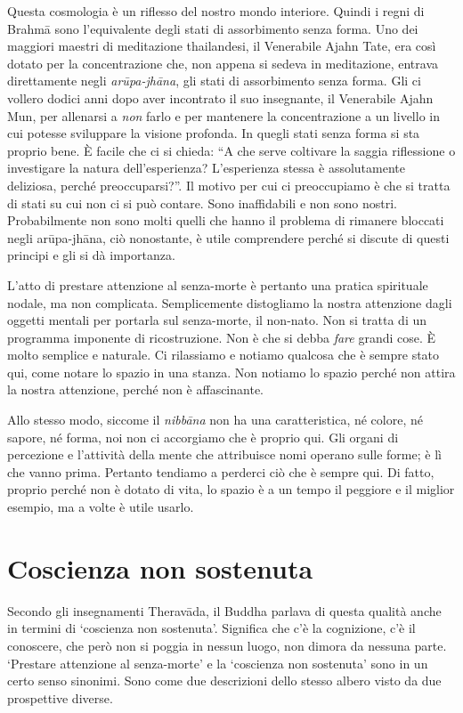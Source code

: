Questa cosmologia è un riflesso del nostro mondo interiore. Quindi i regni di Brahmā sono l'equivalente degli stati di assorbimento senza forma. Uno dei maggiori maestri di meditazione thailandesi, il Venerabile Ajahn Tate, era così dotato per la concentrazione che, non appena si sedeva in meditazione, entrava direttamente negli \textit{arūpa-jhāna}, gli stati di assorbimento senza forma. Gli ci vollero dodici anni dopo aver incontrato il suo insegnante, il Venerabile Ajahn Mun, per allenarsi a \textit{non} farlo e per mantenere la concentrazione a un livello in cui potesse sviluppare la visione profonda. In quegli stati senza forma si sta proprio bene. È facile che ci si chieda: ``A che serve coltivare la saggia riflessione o investigare la natura dell'esperienza? L'esperienza stessa è assolutamente deliziosa, perché preoccuparsi?''. Il motivo per cui ci preoccupiamo è che si tratta di stati su cui non ci si può contare. Sono inaffidabili e non sono nostri. Probabilmente non sono molti quelli che hanno il problema di rimanere bloccati negli arūpa-jhāna, ciò nonostante, è utile comprendere perché si discute di questi principi e gli si dà importanza.

L'atto di prestare attenzione al senza-morte è pertanto una pratica spirituale nodale, ma non complicata. Semplicemente distogliamo la nostra attenzione dagli oggetti mentali per portarla sul senza-morte, il non-nato. Non si tratta di un programma imponente di ricostruzione. Non è che si debba \textit{fare} grandi cose. È molto semplice e naturale. Ci rilassiamo e notiamo qualcosa che è sempre stato qui, come notare lo spazio in una stanza. Non notiamo lo spazio perché non attira la nostra attenzione, perché non è affascinante.

Allo stesso modo, siccome il \textit{nibbāna} non ha una caratteristica, né colore, né sapore, né forma, noi non ci accorgiamo che è proprio qui. Gli organi di percezione e l'attività della mente che attribuisce nomi operano sulle forme; è lì che vanno prima. Pertanto tendiamo a perderci ciò che è sempre qui. Di fatto, proprio perché non è dotato di vita, lo spazio è a un tempo il peggiore e il miglior esempio, ma a volte è utile usarlo.

\section*{Coscienza non sostenuta}

Secondo gli insegnamenti Theravāda, il Buddha parlava di questa qualità anche in termini di `coscienza non sostenuta'. Significa che c'è la cognizione, c'è il conoscere, che però non si poggia in nessun luogo, non dimora da nessuna parte. `Prestare attenzione al senza-morte' e la `coscienza non sostenuta' sono in un certo senso sinonimi. Sono come due descrizioni dello stesso albero visto da due prospettive diverse.

